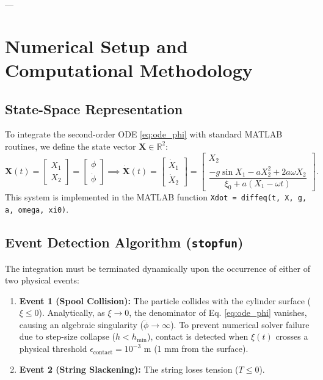 \documentclass[11pt,a4paper]{article}
\begin{document}
---

\section{Numerical Setup and Computational Methodology}
\label{sec:numerical}

\subsection{State-Space Representation}
To integrate the second-order ODE \eqref{eq:ode_phi} with standard MATLAB routines, we define the state vector $\mathbf{X} \in \mathbb{R}^2$:
\begin{equation}
    \mathbf{X}(t) = \begin{bmatrix} X_1 \\ X_2 \end{bmatrix} = \begin{bmatrix} \phi \\ \dot{\phi} \end{bmatrix} \implies \dot{\mathbf{X}}(t) = \begin{bmatrix} \dot{X}_1 \\ \dot{X}_2 \end{bmatrix} = \begin{bmatrix} X_2 \\ \dfrac{-g\sin X_1 - a X_2^2 + 2a\omega X_2}{\xi_0 + a(X_1 - \omega t)} \end{bmatrix}.
\end{equation}
This system is implemented in the MATLAB function \texttt{Xdot = diffeq(t, X, g, a, omega, xi0)}.

\subsection{Event Detection Algorithm (\texttt{stopfun})}
The integration must be terminated dynamically upon the occurrence of either of two physical events:
\begin{enumerate}
    \item \textbf{Event 1 (Spool Collision):} The particle collides with the cylinder surface ($\xi \le 0$). Analytically, as $\xi \to 0$, the denominator of Eq. \eqref{eq:ode_phi} vanishes, causing an algebraic singularity ($\ddot{\phi} \to \infty$). To prevent numerical solver failure due to step-size collapse ($h < h_{\text{min}}$), contact is detected when $\xi(t)$ crosses a physical threshold $\epsilon_{\text{contact}} = 10^{-3}\text{ m}$ (1 mm from the surface).
    \item \textbf{Event 2 (String Slackening):} The string loses tension ($T \le 0$).
\end{enumerate}
\end{document}
